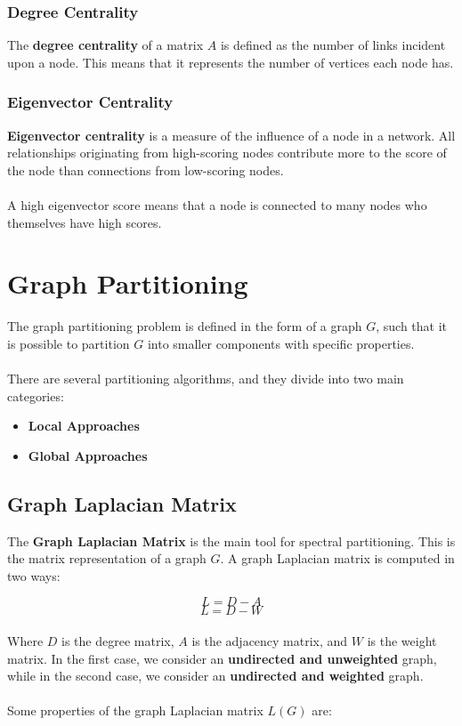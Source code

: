 \documentclass{article}
\begin{document}
\subsubsection{Degree Centrality}
The \textbf{degree centrality} of a matrix $A$ is defined as the number of links incident upon a node. This means that it represents the number of vertices each node has.

\subsubsection{Eigenvector Centrality}
\textbf{Eigenvector centrality} is a measure of the influence of a node in a network. All relationships originating from high-scoring nodes contribute more to the score of the node than connections from low-scoring nodes. \\ \\
A high eigenvector score means that a node is connected to many nodes who themselves have high scores.

\section{Graph Partitioning}
The graph partitioning problem is defined in the form of a graph $G$, such that it is possible to partition $G$ into smaller components with specific properties. \\ \\
There are several partitioning algorithms, and they divide into two main categories:

\begin{itemize}
	\item \textbf{Local Approaches}
	\item \textbf{Global Approaches}
\end{itemize}

\subsection{Graph Laplacian Matrix}
The \textbf{Graph Laplacian Matrix} is the main tool for spectral partitioning. This is the matrix representation of a graph $G$. A graph Laplacian matrix is computed in two ways:

\[ L = D - A \]
\[ L = D - W \] \\
Where $D$ is the degree matrix, $A$ is the adjacency matrix, and $W$ is the weight matrix. In the first case, we consider an \textbf{undirected and unweighted} graph, while in the second case, we consider an \textbf{undirected and weighted} graph. \\ \\
Some properties of the graph Laplacian matrix $L(G)$ are:
\end{document}
